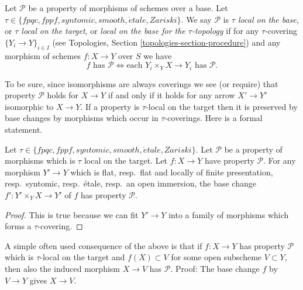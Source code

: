 \begin{definition}
\label{definition-property-morphisms-local}
Let $\mathcal{P}$ be a property of morphisms of schemes over a base.
Let $\tau \in \{fpqc, fppf, syntomic, smooth, \acute{e}tale, Zariski\}$.
We say $\mathcal{P}$ is {\it $\tau$ local on the base}, or
{\it $\tau$ local on the target}, or
{\it local on the base for the $\tau$-topology} if for any
$\tau$-covering $\{Y_i \to Y\}_{i \in I}$ (see
Topologies, Section \ref{topologies-section-procedure})
and any morphism of schemes $f : X \to Y$ over $S$ we 
have
$$
f \text{ has }\mathcal{P}
\Leftrightarrow
\text{each }Y_i \times_Y X \to Y_i\text{ has }\mathcal{P}.
$$
\end{definition}

\noindent
To be sure, since isomorphisms are always coverings
we see (or require) that property $\mathcal{P}$ holds for $X \to Y$
if and only if it holds for any arrow $X' \to Y'$ isomorphic to $X \to Y$.
If a property is $\tau$-local on the target then it is preserved
by base changes by morphisms which occur in $\tau$-coverings. Here
is a formal statement.

\begin{lemma}
\label{lemma-pullback-property-local-target}
Let $\tau \in \{fpqc, fppf, syntomic, smooth, \acute{e}tale, Zariski\}$.
Let $\mathcal{P}$ be a property of morphisms which is $\tau$ local
on the target. Let $f : X \to Y$ have property $\mathcal{P}$.
For any morphism $Y' \to Y$ which is
flat, resp.\ flat and locally of finite presentation, resp.\ syntomic,
resp.\ \'etale, resp.\ an open immersion, the base change
$f' : Y' \times_Y X \to Y'$ of $f$ has property $\mathcal{P}$.
\end{lemma}

\begin{proof}
This is true because we can fit $Y' \to Y$ into a family of
morphisms which forms a $\tau$-covering.
\end{proof}

\noindent
A simple often used consequence of the above is that if
$f : X \to Y$ has property $\mathcal{P}$ which is $\tau$-local
on the target and $f(X) \subset V$
for some open subscheme $V \subset Y$, then also the induced
morphism $X \to V$ has $\mathcal{P}$. Proof: The base change
$f$ by $V \to Y$ gives $X \to V$.

